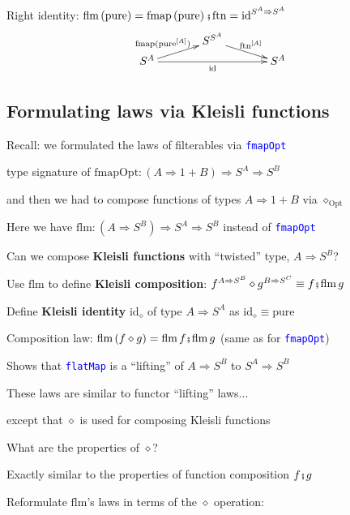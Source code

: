 Right identity: $\text{flm}\left(\text{pure}\right)=\text{fmap}\left(\text{pure}\right)\bef\text{ftn}=\text{id}^{S^{A}\Rightarrow S^{A}}$
\[
\xymatrix{\xyScaleY{0.2pc}\xyScaleX{3pc} & S^{S^{A}}\ar[rd]\sp(0.5){\ \text{ftn}^{[A]}\ }\\
S^{A}\ar[ru]\sp(0.5){\text{fmap}(\text{pure}^{[A]})\quad}\ar[rr]\sb(0.5){\text{id}} &  & S^{A}
}
\]


\subsection{Formulating laws via Kleisli functions}

Recall: we formulated the laws of filterables via \texttt{\textcolor{blue}{\footnotesize{}fmapOpt}} 

type signature of $\text{fmapOpt}:\left(A\Rightarrow1+B\right)\Rightarrow S^{A}\Rightarrow S^{B}$

and then we had to compose functions of types $A\Rightarrow1+B$ via
$\diamond_{\text{Opt}}$

Here we have{\small{} $\text{flm}:\left(A\Rightarrow S^{B}\right)\Rightarrow S^{A}\Rightarrow S^{B}$}
instead of \texttt{\textcolor{blue}{\footnotesize{}fmapOpt}} 

Can we compose \textbf{Kleisli functions} with ``twisted'' type,
$A\Rightarrow S^{B}$?

Use $\text{flm}$ to define \textbf{Kleisli composition}: $f^{A\Rightarrow S^{B}}\diamond g^{B\Rightarrow S^{C}}\equiv f\bef\text{flm}\,g$

Define \textbf{Kleisli identity} $\text{id}_{\diamond}$ of type $A\Rightarrow S^{A}$
as $\text{id}_{\diamond}\equiv\text{pure}$

Composition law: $\text{flm}\left(f\diamond g\right)=\text{flm}\,f\bef\text{flm}\,g$
(same as for \texttt{\textcolor{blue}{\footnotesize{}fmapOpt}})

Shows that \texttt{\textcolor{blue}{\footnotesize{}flatMap}} is a
``lifting'' of $A\Rightarrow S^{B}$ to $S^{A}\Rightarrow S^{B}$

These laws are similar to functor ``lifting'' laws...

except that $\diamond$ is used for composing Kleisli functions

What are the properties of $\diamond$?

Exactly similar to the properties of function composition $f\bef g$

Reformulate $\text{flm}$'s laws in terms of the $\diamond$ operation:

